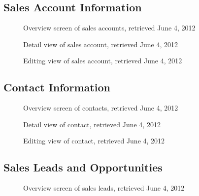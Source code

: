 \FloatBarrier
\subsection{Sales Account Information}
\begin{figure}[htbp]
	\centering
	\caption[salesforce.com: Overview screen of sales accounts]{Overview screen of sales accounts, retrieved June 4, 2012}
\end{figure}

\begin{figure}[htbp]
	\centering
	\caption[salesforce.com: Detail view of sales account]{Detail view of sales account, retrieved June 4, 2012}
\end{figure}

\begin{figure}[htbp]
	\centering
	\caption[salesforce.com: Editing view of sales account]{Editing view of sales account, retrieved June 4, 2012}
\end{figure}

\FloatBarrier
\subsection{Contact Information}
\begin{figure}[htbp]
	\centering
	\caption[salesforce.com: Overview screen of contacts]{Overview screen of contacts, retrieved June 4, 2012}
\end{figure}

\begin{figure}[htbp]
	\centering
	\caption[salesforce.com: Detail view of contact]{Detail view of contact, retrieved June 4, 2012}
\end{figure}

\begin{figure}[htbp]
	\centering
	\caption[salesforce.com: Editing view of contact]{Editing view of contact, retrieved June 4, 2012}
\end{figure}

\FloatBarrier
\subsection{Sales Leads and Opportunities}
\begin{figure}[htbp]
	\centering
	\caption[salesforce.com: Overview screen of sales leads]{Overview screen of sales leads, retrieved June 4, 2012}
\end{figure}


